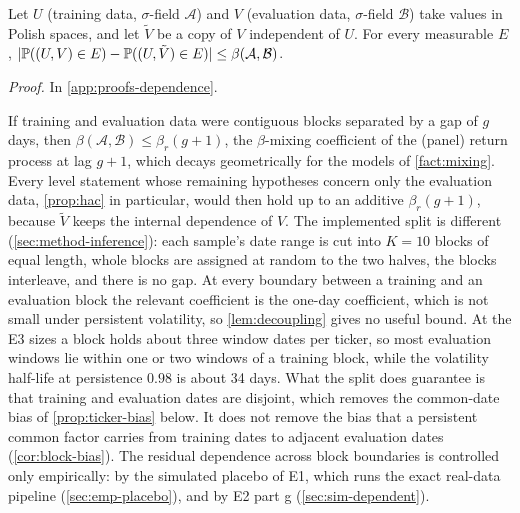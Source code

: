 \begin{lemma}[Decoupling]\label{lem:decoupling}
Let $U$ (training data, $\sigma$-field $\mathcal A$) and $V$ (evaluation data, $\sigma$-field
$\mathcal B$) take values in Polish spaces, and let $\tilde V$ be a copy of $V$ independent of $U$.
For every measurable $E$, $\lvert\mathbb{P}((U,V)\in E)-\mathbb{P}((U,\tilde V)\in E)\rvert\le\beta(\mathcal A,\mathcal B)$.
\end{lemma}
\noindent\textit{Proof.} In \cref{app:proofs-dependence}.

If training and evaluation data were contiguous blocks separated by a gap of $g$ days, then
$\beta(\mathcal A,\mathcal B)\le\beta_r(g+1)$, the $\beta$-mixing coefficient of the (panel) return
process at lag $g+1$, which decays geometrically for the models of \cref{fact:mixing}. Every level
statement whose remaining hypotheses concern only the evaluation data, \cref{prop:hac} in
particular, would then hold up to an additive $\beta_r(g+1)$, because $\tilde V$ keeps the internal
dependence of $V$. The implemented split is different (\cref{sec:method-inference}): each sample's
date range is cut into $K=10$ blocks of equal length, whole blocks are assigned at random to the
two halves, the blocks interleave, and there is no gap. At every boundary between a training and
an evaluation block the relevant coefficient is the one-day coefficient, which is not small under
persistent volatility, so \cref{lem:decoupling} gives no useful bound. At the E3 sizes a \TEST{}
block holds about three window dates per ticker, so most evaluation windows lie within one or two
windows of a training block, while the volatility half-life at persistence $0.98$ is about 34
days. What the split does guarantee is that training and evaluation dates are disjoint, which
removes the common-date bias of \cref{prop:ticker-bias} below. It does not remove the bias that a
persistent common factor carries from training dates to adjacent evaluation dates
(\cref{cor:block-bias}). The residual dependence across block boundaries is controlled only
empirically: by the simulated placebo of E1, which runs the exact real-data pipeline
(\cref{sec:emp-placebo}), and by E2 part g (\cref{sec:sim-dependent}).


